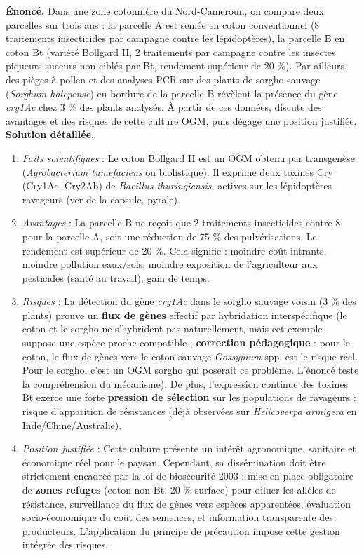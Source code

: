 \documentclass[11pt]{article}
\begin{document}
\begin{exoresolu}
\textbf{Énoncé.} Dans une zone cotonnière du Nord-Cameroun, on compare deux parcelles sur trois ans : la parcelle A est semée en coton conventionnel (8 traitements insecticides par campagne contre les lépidoptères), la parcelle B en coton Bt (variété Bollgard II, 2 traitements par campagne contre les insectes piqueurs-suceurs non ciblés par Bt, rendement supérieur de 20 \%). Par ailleurs, des pièges à pollen et des analyses PCR sur des plants de sorgho sauvage (\emph{Sorghum halepense}) en bordure de la parcelle B révèlent la présence du gène \emph{cry1Ac} chez 3 \% des plants analysés. À partir de ces données, discute des avantages et des risques de cette culture OGM, puis dégage une position justifiée.
\tcblower
\textbf{Solution détaillée.}
\begin{enumerate}
\item \emph{Faits scientifiques} : Le coton Bollgard II est un OGM obtenu par transgenèse (\emph{Agrobacterium tumefaciens} ou biolistique). Il exprime deux toxines Cry (Cry1Ac, Cry2Ab) de \emph{Bacillus thuringiensis}, actives sur les lépidoptères ravageurs (ver de la capsule, pyrale).
\item \emph{Avantages} : La parcelle B ne reçoit que 2 traitements insecticides contre 8 pour la parcelle A, soit une réduction de 75 \% des pulvérisations. Le rendement est supérieur de 20 \%. Cela signifie : moindre coût intrants, moindre pollution eaux/sols, moindre exposition de l'agriculteur aux pesticides (santé au travail), gain de temps.
\item \emph{Risques} : La détection du gène \emph{cry1Ac} dans le sorgho sauvage voisin (3 \% des plants) prouve un \textbf{flux de gènes} effectif par hybridation interspécifique (le coton et le sorgho ne s'hybrident pas naturellement, mais cet exemple suppose une espèce proche compatible ; \textbf{correction pédagogique} : pour le coton, le flux de gènes vers le coton sauvage \emph{Gossypium} spp. est le risque réel. Pour le sorgho, c'est un OGM sorgho qui poserait ce problème. L'énoncé teste la compréhension du mécanisme). De plus, l'expression continue des toxines Bt exerce une forte \textbf{pression de sélection} sur les populations de ravageurs : risque d'apparition de résistances (déjà observées sur \emph{Helicoverpa armigera} en Inde/Chine/Australie).
\item \emph{Position justifiée} : Cette culture présente un intérêt agronomique, sanitaire et économique réel pour le paysan. Cependant, sa dissémination doit être strictement encadrée par la loi de biosécurité 2003 : mise en place obligatoire de \textbf{zones refuges} (coton non-Bt, 20 \% surface) pour diluer les allèles de résistance, surveillance du flux de gènes vers espèces apparentées, évaluation socio-économique du coût des semences, et information transparente des producteurs. L'application du principe de précaution impose cette gestion intégrée des risques.
\end{enumerate}
\end{exoresolu}
\end{document}
